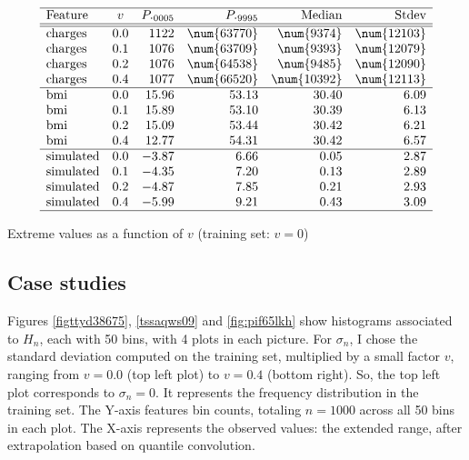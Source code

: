\documentclass[oneside,10pt]{book}
\renewcommand{\arraystretch}{1.4} %
\begin{document}
\renewcommand{\arraystretch}{1.0} %
\renewcommand{\arraystretch}{1.2} %
\begin{table}[H]
\small
\[
\begin{array}{lcrrrr}
\hline
\text{Feature}  &v  & P._{0005} & P._{9995} & \text{Median} & \text{Stdev} \\
\hline
\hline
\text{charges} & 0.0 & 1122 & \num{63770} &  \num{9374} & \num{12103}\\
\text{charges} & 0.1 & 1076 & \num{63709} &  \num{9393}  & \num{12079} \\
\text{charges} & 0.2 & 1076 & \num{64538} &  \num{9485}  &  \num{12090}\\
\text{charges} & 0. 4& 1077 & \num{66520} & \num{10392}  & \num{12113}\\
\hline
\text{bmi} & 0.0  &  15.96 &53.13 &30.40 & 6.09 \\
\text{bmi} & 0.1 & 15.89 & 53.10 & 30.39 & 6.13 \\
\text{bmi} & 0.2  & 15.09 &53.44 &30.42 & 6.21 \\
\text{bmi} & 0.4  & 12.77 & 54.31&30.42&6.57\\
\hline
\text{simulated} & 0.0  &  -3.87& 6.66& 0.05&2.87\\
\text{simulated} & 0.1  & -4.35& 7.20& 0.13&2.89\\
\text{simulated} & 0.2  &  -4.87&7.85& 0.21&2.93\\
\text{simulated} & 0.4  & -5.99& 9.21& 0.43&3.09\\
\hline
\end{array}
\]
\caption{\label{widthprtz09} Extreme values as a function of $v$ (training set: $v=0$)}
\end{table}
\renewcommand{\arraystretch}{1.0} %




\subsection{Case studies} \label{cscsder}

Figures \ref{figttyd38675}, \ref{tssaqws09} and \ref{fig:pif65lkh} show histograms associated to $H_n$, each with 50 bins, with 4 plots in each picture.
 For $\sigma_n$, I chose the standard deviation computed on the training set, multiplied
 by a small factor $v$, ranging from $v=0.0$ (top left plot) to $v=0.4$ (bottom right).
So, the top left plot corresponds to $\sigma_n=0$. It represents the frequency distribution in the training set. The Y-axis features bin counts, totaling $n=1000$ across all 50 bins in each plot. The X-axis represents  the
 observed values: the extended range, after extrapolation based on quantile convolution.
\end{document}
